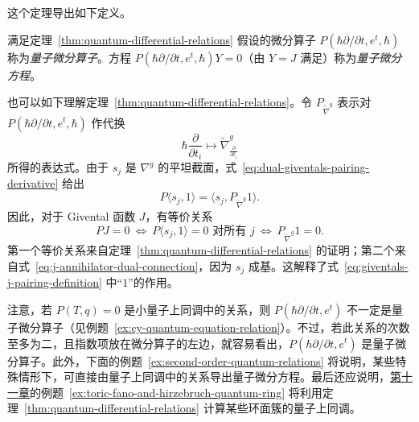 这个定理导出如下定义。
\begin{definition}\label{def:quantum-differential-operator}
满足定理~\ref{thm:quantum-differential-relations} 假设的微分算子 $P(\hbar\partial/\partial t,e^t,\hbar)$ 称为\emph{量子微分算子}。方程 $P(\hbar\partial/\partial t,e^t,\hbar)Y=0$（由 $Y=J$ 满足）称为\emph{量子微分方程}。
\end{definition}

也可以如下理解定理~\ref{thm:quantum-differential-relations}。令 $P_{\widetilde\nabla^g}$ 表示对 $P(\hbar\partial/\partial t,e^t,\hbar)$ 作代换
\[
\hbar\frac{\partial}{\partial t_i}\longmapsto
\widetilde\nabla^g_{\frac{\partial}{\partial t_i}}
\]
所得的表达式。由于 $s_j$ 是 $\nabla^g$ 的平坦截面，式~\eqref{eq:dual-giventals-pairing-derivative} 给出
\begin{equation}\label{eq:j-annihilator-dual-connection}
P\langle s_j,1\rangle=\langle s_j,P_{\widetilde\nabla^g}1\rangle.
\end{equation}
因此，对于 Givental 函数 $J$，有等价关系
\begin{equation}\label{eq:j-annihilator-equivalences}
PJ=0\ \Longleftrightarrow\ P\langle s_j,1\rangle=0\text{ 对所有 }j
\ \Longleftrightarrow\ P_{\widetilde\nabla^g}1=0.
\end{equation}
第一个等价关系来自定理~\ref{thm:quantum-differential-relations} 的证明；第二个来自式~\eqref{eq:j-annihilator-dual-connection}，因为 $s_j$ 成基。这解释了式~\eqref{eq:giventals-j-pairing-definition} 中“$1$”的作用。

注意，若 $P(T,q)=0$ 是小量子上同调中的关系，则 $P(\hbar\partial/\partial t,e^t)$ 不一定是量子微分算子（见例题~\ref{ex:cy-quantum-equation-relation}）。不过，若此关系的次数至多为二，且指数项放在微分算子的左边，就容易看出，$P(\hbar\partial/\partial t,e^t)$ 是量子微分算子。此外，下面的例题~\ref{ex:second-order-quantum-relations} 将说明，某些特殊情形下，可直接由量子上同调中的关系导出量子微分方程。最后还应说明，\hyperref[chap:mirror-theorem]{第十一章}的例题~\ref{ex:toric-fano-and-hirzebruch-quantum-ring} 将利用定理~\ref{thm:quantum-differential-relations} 计算某些环面簇的量子上同调。

